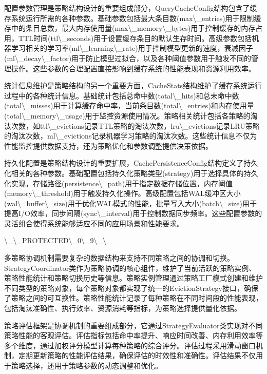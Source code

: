 配置参数管理是策略结构设计的重要组成部分，QueryCacheConfig结构包含了缓存系统运行所需的各种参数。基础参数包括最大条目数(max\textbackslash{}_entries)用于限制缓存中的条目总数，最大内存使用量(max\textbackslash{}_memory\textbackslash{}_bytes)用于控制缓存的内存占用，TTL时间(ttl\textbackslash{}_seconds)用于设置缓存条目的默认生存时间。高级参数包括机器学习相关的学习率(ml\textbackslash{}_learning\textbackslash{}_rate)用于控制模型更新的速度，衰减因子(ml\textbackslash{}_decay\textbackslash{}_factor)用于防止模型过拟合，以及各种阈值参数用于触发不同的管理操作。这些参数的合理配置直接影响到缓存系统的性能表现和资源利用效率。

统计信息维护是策略结构的另一个重要方面，CacheStats结构维护了缓存系统运行过程中的各种统计信息。基础统计包括总命中数(total\textbackslash{}_hits)和总未命中数(total\textbackslash{}_misses)用于计算缓存命中率，当前条目数(total\textbackslash{}_entries)和内存使用量(total\textbackslash{}_memory\textbackslash{}_usage)用于监控资源使用情况。策略相关统计包括各策略的淘汰次数，如ttl\textbackslash{}_evictions记录TTL策略的淘汰次数，lru\textbackslash{}_evictions记录LRU策略的淘汰次数，ml\textbackslash{}_evictions记录机器学习策略的淘汰次数。这些统计信息不仅为性能监控提供数据支持，还为策略优化和参数调整提供决策依据。

持久化配置是策略结构设计的重要扩展，CachePersistenceConfig结构定义了持久化相关的各种参数。基础配置包括持久化策略类型(strategy)用于选择具体的持久化实现，存储路径(persistence\textbackslash{}_path)用于指定数据存储位置，内存阈值(memory\textbackslash{}_threshold)用于触发持久化操作。高级配置包括WAL缓冲区大小(wal\textbackslash{}_buffer\textbackslash{}_size)用于优化WAL模式的性能，批量写入大小(batch\textbackslash{}_size)用于提高I/O效率，同步间隔(sync\textbackslash{}_interval)用于控制数据同步频率。这些配置参数的灵活组合使得系统能够适应不同的应用场景和性能要求。

\textbackslash{}_\textbackslash{}_PROTECTED\textbackslash{}_0\textbackslash{}_9\textbackslash{}_\textbackslash{}_

多策略协调机制需要复杂的数据结构来支持不同策略之间的协调和切换。StrategyCoordinator类作为策略协调的核心组件，维护了当前活跃的策略实例、策略性能统计和策略切换历史等信息。策略实例管理通过策略工厂模式创建和维护不同类型的策略对象，每个策略对象都实现了统一的EvictionStrategy接口，确保了策略之间的可互换性。策略性能统计记录了每种策略在不同时间段的性能表现，包括淘汰准确性、执行效率、资源消耗等指标，为策略选择提供量化依据。

策略评估框架是协调机制的重要组成部分，它通过StrategyEvaluator类实现对不同策略性能的客观评估。评估指标包括命中率提升、响应时间改善、内存利用效率等多个维度，通过加权评分模型计算每种策略的综合评分。评估过程采用滑动窗口机制，定期更新策略的性能评估结果，确保评估的时效性和准确性。评估结果不仅用于策略选择，还用于策略参数的动态调整和优化。

